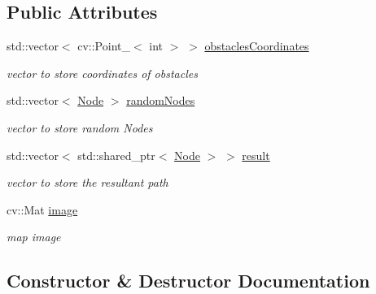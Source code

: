 \subsection*{Public Attributes}
\begin{DoxyCompactItemize}
\item 
\mbox{\label{classMap_a0b7fb579f17e524e171541c657f7ca43}} 
std\+::vector$<$ cv\+::\+Point\+\_\+$<$ int $>$ $>$ \mbox{\hyperlink{classMap_a0b7fb579f17e524e171541c657f7ca43}{obstacles\+Coordinates}}
\begin{DoxyCompactList}\small\item\em vector to store coordinates of obstacles \end{DoxyCompactList}\item 
\mbox{\label{classMap_af20cf58ac4a736bc136a778ba0546c80}} 
std\+::vector$<$ \mbox{\hyperlink{classNode}{Node}} $>$ \mbox{\hyperlink{classMap_af20cf58ac4a736bc136a778ba0546c80}{random\+Nodes}}
\begin{DoxyCompactList}\small\item\em vector to store random Nodes \end{DoxyCompactList}\item 
\mbox{\label{classMap_afa8ddf2185f958b8b3d87a4452837196}} 
std\+::vector$<$ std\+::shared\+\_\+ptr$<$ \mbox{\hyperlink{classNode}{Node}} $>$ $>$ \mbox{\hyperlink{classMap_afa8ddf2185f958b8b3d87a4452837196}{result}}
\begin{DoxyCompactList}\small\item\em vector to store the resultant path \end{DoxyCompactList}\item 
\mbox{\label{classMap_a855ad84d7727a8cc2cf9cfe77816d6d6}} 
cv\+::\+Mat \mbox{\hyperlink{classMap_a855ad84d7727a8cc2cf9cfe77816d6d6}{image}}
\begin{DoxyCompactList}\small\item\em map image \end{DoxyCompactList}\end{DoxyCompactItemize}


\subsection{Constructor \& Destructor Documentation}
\mbox{\label{classMap_a0f5ad0fd4563497b4214038cbca8b582}} 
